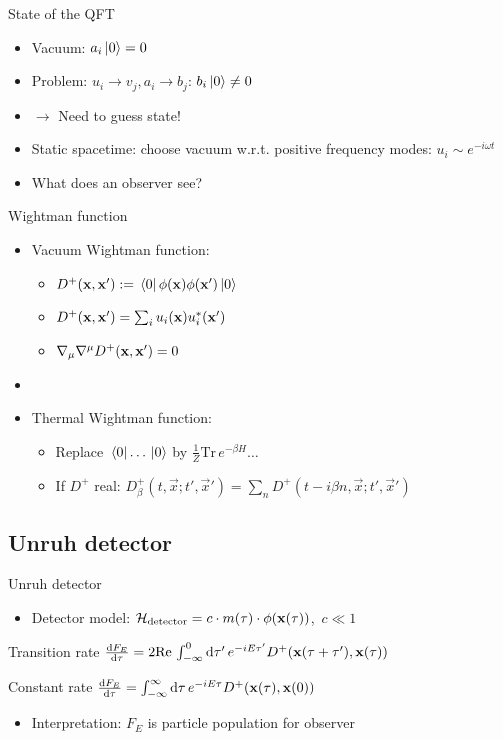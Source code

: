 \documentclass{beamer}
\renewcommand{\va}[1]{\vec{#1}}
\newcommand{\ind}[1]{_\mathrm{#1}}
\begin{document}
\begin{frame}{State of the QFT\cite{davies}}
\begin{itemize}
	\item Vacuum: \(a_i \ket*{0} = 0\)
	\item Problem: \(u_i \to v_j, a_i \to b_j\): \(b_i \ket*{0} \neq 0\)
	\item[] \(\to\) Need to guess state!
	\item Static spacetime: choose vacuum w.r.t. positive frequency modes: \(u_i \sim e^{-i\omega t}\)
	\item What does an observer see? 
\end{itemize}
\end{frame}

\begin{frame}{Wightman function\cite{davies}}
\begin{itemize}
	\item Vacuum Wightman function: 
	\begin{itemize}
		\item \(D^+(\vb{x},\vb{x}') := \bra*{0}\phi(\vb{x})\phi(\vb{x}')\ket*{0}\)
		\item \(D^+(\vb{x},\vb{x}') = \sum_i u_i(\vb{x}) u_i^*(\vb{x}')\)
		\item \(\nabla_\mu\nabla^\mu D^+(\vb{x},\vb{x}') = 0\)
	\end{itemize}
	\item[]
	\item Thermal Wightman function:
	\begin{itemize}
		\item Replace \(\bra*{0}\dots\ket*{0}\) by \(\frac{1}{Z} \mathrm{Tr}\,e^{-\beta H} \dots\)
		\item If \(D^+\) real: \(D^+_\beta(t,\va{x};t',\va{x}') = \sum_n D^+(t-i\beta n, \va{x};t',\va{x}')\)
	\end{itemize}
\end{itemize}
\end{frame}

\subsection{Unruh detector}
\begin{frame}{Unruh detector\cite{davies}}
\begin{itemize}
	\item Detector model: \(\mathcal{H}\ind{detector} = c \cdot m(\tau)\cdot \phi(\vb{x}(\tau))\),\, \(c \ll 1\)
\end{itemize}
\begin{block}{Transition rate}
\(\dv{F_E}{\tau} = 2 \mathrm{Re}\,\int_{-\infty}^0 \dd{\tau'} e^{-i E \tau'} D^+(\vb{x}(\tau + \tau'), \vb{x}(\tau))\)
\end{block}
\begin{block}{Constant rate}
\(\dv{F_E}{\tau} = \int_{-\infty}^\infty \dd{\tau} e^{-i E \tau} D^+(\vb{x}(\tau), \vb{x}(0))\)
\end{block}
\begin{itemize}
	\item Interpretation: \(F_E\) is particle population for observer 
\end{itemize}
\end{frame}
\end{document}
